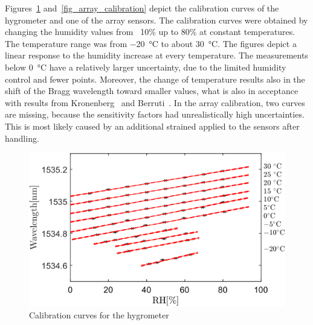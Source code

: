 \newpage
Figures~\ref{fig_single_calibration} and~\ref{fig_array_calibration} depict the calibration curves of the hygrometer and one of the array sensors. The calibration curves were obtained by changing the humidity values from ~10\% up to 80\% at constant temperatures. The temperature range was from \SI{-20}{\celsius} to about \SI{30}{\celsius}. The figures depict a linear response to the humidity increase at every temperature. The measurements below \SI{0}{\celsius} have a relatively larger uncertainty, due to the limited humidity control and fewer points. Moreover, the change of temperature results also in the shift of the Bragg wavelength toward smaller values, what is also in acceptance with results from Kronenberg~\cite{Kronenberg:02} and Berruti~\cite{Berruti}. In the array calibration, two curves are missing, because the sensitivity factors had unrealistically high uncertainties. This is most likely caused by an additional strained applied to the sensors after handling. %

\begin{figure}[!h]
\centering
\includegraphics[width=0.8\columnwidth]{Chapter5/images/RHS.png}
\caption{Calibration curves for the hygrometer}
\label{fig_single_calibration}
\end{figure}

